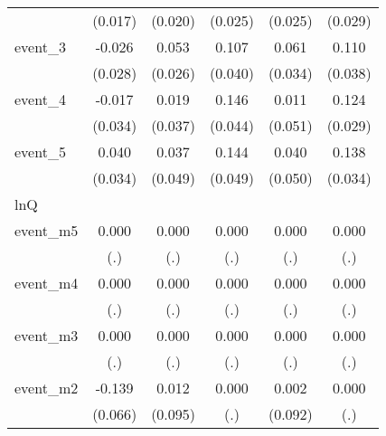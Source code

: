 {\begin{tabular}{l*{5}{c}}
            &     (0.017)         &     (0.020)         &     (0.025)         &     (0.025)         &     (0.029)         \\
[1em]
event\_3     &      -0.026         &       0.053\sym{*}  &       0.107\sym{**} &       0.061         &       0.110\sym{**} \\
            &     (0.028)         &     (0.026)         &     (0.040)         &     (0.034)         &     (0.038)         \\
[1em]
event\_4     &      -0.017         &       0.019         &       0.146\sym{***}&       0.011         &       0.124\sym{***}\\
            &     (0.034)         &     (0.037)         &     (0.044)         &     (0.051)         &     (0.029)         \\
[1em]
event\_5     &       0.040         &       0.037         &       0.144\sym{**} &       0.040         &       0.138\sym{***}\\
            &     (0.034)         &     (0.049)         &     (0.049)         &     (0.050)         &     (0.034)         \\
\hline
lnQ         &                     &                     &                     &                     &                     \\
event\_m5    &       0.000         &       0.000         &       0.000         &       0.000         &       0.000         \\
            &         (.)         &         (.)         &         (.)         &         (.)         &         (.)         \\
[1em]
event\_m4    &       0.000         &       0.000         &       0.000         &       0.000         &       0.000         \\
            &         (.)         &         (.)         &         (.)         &         (.)         &         (.)         \\
[1em]
event\_m3    &       0.000         &       0.000         &       0.000         &       0.000         &       0.000         \\
            &         (.)         &         (.)         &         (.)         &         (.)         &         (.)         \\
[1em]
event\_m2    &      -0.139\sym{*}  &       0.012         &       0.000         &       0.002         &       0.000         \\
            &     (0.066)         &     (0.095)         &         (.)         &     (0.092)         &         (.)         \\

\end{tabular}}
